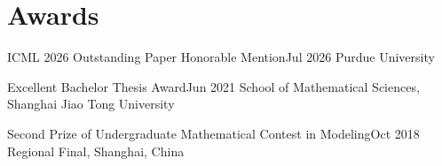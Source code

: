 \section{Awards}

\begin{resumeEntries}
  \resumeAward
    {ICML 2026 Outstanding Paper Honorable Mention}{Jul 2026}
    {Purdue University}

  \resumeAward
    {Excellent Bachelor Thesis Award}{Jun 2021}
    {School of Mathematical Sciences, Shanghai Jiao Tong University}

  \resumeAward
    {Second Prize of Undergraduate Mathematical Contest in Modeling}{Oct 2018}
    {Regional Final, Shanghai, China}
\end{resumeEntries}
